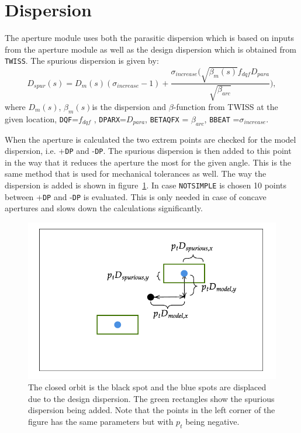 \section{Dispersion}
The aperture module uses both the parasitic dispersion which is based on inputs from the aperture module as well as the design dispersion which is
obtained from \texttt{TWISS}. The spurious dispersion is given by:
\begin{equation}
D_{spur}(s) =  D_m(s)(\sigma_{increase}-1) +\frac{\sigma_{increase}(\sqrt{\beta _m (s)}  f_{dqf}D_{para}}{\sqrt{\beta _{arc}}}),
\end{equation}
where $D_m(s)$, $\beta_m(s) $is the dispersion and $\beta$-function from TWISS at the given location, 
\texttt{DQF}=$f_{dqf}$ , \texttt{DPARX}=$D_{para}$, \texttt{BETAQFX} = $\beta_{arc}$, \texttt{BBEAT} =$\sigma_{increase}$. 

When the aperture is calculated the two extrem points are checked for the model dispersion, i.e. +\texttt{DP} and -\texttt{DP}. The spurious dispersion is then added to this point in the way that it reduces the aperture the most for the given angle. This is the same method that is used for mechanical tolerances as well. The way the dispersion is added is shown in figure~\ref{fig:aper:dispersion}. In case \texttt{NOTSIMPLE} is chosen 10 points between +\texttt{DP} and -\texttt{DP} is evaluated. This is only needed in case of concave apertures and slows down the calculations significantly. 
 
\begin{figure}[htb]
  \centering
  \includegraphics[width=250bp]{jpg/dispersion_calc.pdf}    
  \caption{The closed orbit is the black spot and the blue spots are displaced due to the design dispersion. The green rectangles show the spurious dispersion being added. Note that the points in the left corner of the figure has the same parameters but with $p_t$ being negative. }
  \label{fig:aper:dispersion}
\end{figure}

